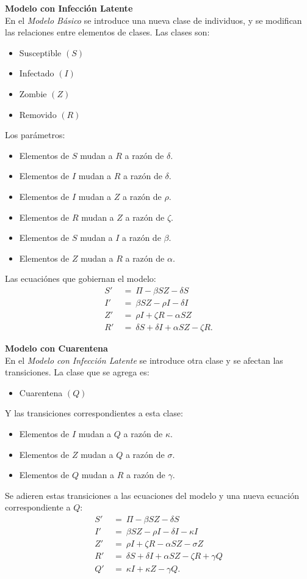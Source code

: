 \documentclass[11pt,spanish]{article}
\begin{document}
\textbf{Modelo con Infección Latente}\\
En el \textit{Modelo Básico} se introduce una nueva clase de individuos, y se modifican las relaciones entre elementos de clases. Las clases son:
\begin{itemize}
\item Susceptible $(S)$
\item Infectado $(I)$
\item Zombie $(Z)$
\item Removido $(R)$
\end{itemize}
Los parámetros:
\begin{itemize}
\item Elementos de $S$ mudan a $R$ a razón de $\delta$.
\item Elementos de $I$ mudan a $R$ a razón de $\delta$.
\item Elementos de $I$ mudan a $Z$ a razón de $\rho$.
\item Elementos de $R$ mudan a $Z$ a razón de $\zeta$.
\item Elementos de $S$ mudan a $I$ a razón de $\beta$.
\item Elementos de $Z$ mudan a $R$ a razón de $\alpha$.
\end{itemize}
Las ecuaciónes que gobiernan el modelo:
\begin{align*}
S' \ & = \ \Pi - \beta S Z - \delta S\\
I' \ & = \ \beta S Z - \rho I - \delta I\\
Z' \ & = \ \rho I + \zeta R - \alpha S Z\\
R' \ & = \ \delta S + \delta I + \alpha S Z - \zeta R.
\end{align*}

\textbf{Modelo con Cuarentena}\\
En el \textit{Modelo con Infección Latente} se introduce otra clase y se afectan las transiciones. La clase que se agrega es:
\begin{itemize}
\item Cuarentena $(Q)$
\end{itemize}
Y las transiciones correspondientes a esta clase:
\begin{itemize}
\item Elementos de $I$ mudan a $Q$ a razón de $\kappa$.
\item Elementos de $Z$ mudan a $Q$ a razón de $\sigma$.
\item Elementos de $Q$ mudan a $R$ a razón de $\gamma$.
\end{itemize}
Se adieren estas transiciones a las ecuaciones del modelo y una nueva ecuación correspondiente a $Q$:
\begin{align*}
S' \ & = \ \Pi - \beta S Z - \delta S\\
I' \ & = \ \beta S Z - \rho I - \delta I - \kappa I\\
Z' \ & = \ \rho I + \zeta R - \alpha S Z - \sigma Z\\
R' \ & = \ \delta S + \delta I + \alpha S Z - \zeta R + \gamma Q\\
Q' \ & = \ \kappa I + \kappa Z - \gamma Q.
\end{align*}
\end{document}
